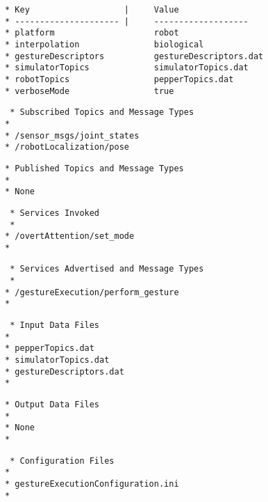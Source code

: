 \documentclass{CSSRforAfrica}
\newcommand{\checkboxChecked}{\fbox{\ding{51}}} %
\begin{document}
\begin{description}
{\begin{verbatim}
* Key                   |     Value 
* --------------------- |     -------------------
* platform                    robot
* interpolation               biological
* gestureDescriptors          gestureDescriptors.dat
* simulatorTopics             simulatorTopics.dat
* robotTopics                 pepperTopics.dat
* verboseMode                 true
\end{verbatim}}

\item[\checkboxChecked] 
 {\small 
\begin{verbatim}
 * Subscribed Topics and Message Types
*
* /sensor_msgs/joint_states
* /robotLocalization/pose
\end{verbatim}}

\newpage
\item[\checkboxChecked] 
 {\small 
\begin{verbatim}                    
* Published Topics and Message Types
*
* None
\end{verbatim}}

\item[\checkboxChecked] 
 {\small 
\begin{verbatim}                    
 * Services Invoked
 * 
* /overtAttention/set_mode
*
\end{verbatim}}

\item[\checkboxChecked] 
 {\small 
\begin{verbatim}                    
 * Services Advertised and Message Types
 *
* /gestureExecution/perform_gesture
* 
\end{verbatim}}

\item[\checkboxChecked] 
 {\small 
\begin{verbatim}
 * Input Data Files
*
* pepperTopics.dat
* simulatorTopics.dat
* gestureDescriptors.dat
*
\end{verbatim}}

\item[\checkboxChecked] 
 {\small 
\begin{verbatim}
* Output Data Files
*
* None
*
\end{verbatim}}

\item[\checkboxChecked] 
 {\small 
\begin{verbatim}
 * Configuration Files
*
* gestureExecutionConfiguration.ini
*
\end{verbatim}}


\end{description}
\end{document}
